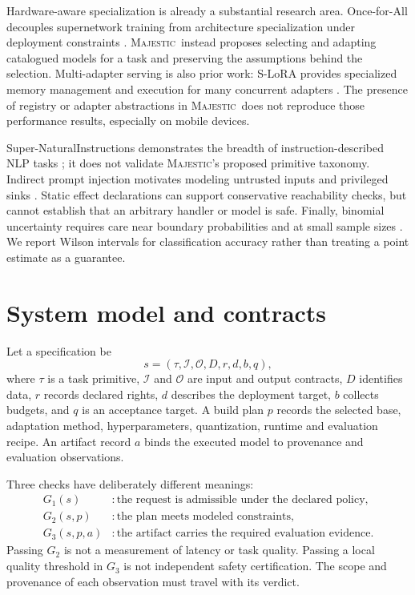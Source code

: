\documentclass[11pt,a4paper]{article}
\newcommand{\sys}{\textsc{Majestic}}
\begin{document}
Hardware-aware specialization is already a substantial research area.
Once-for-All decouples supernetwork training from architecture specialization
under deployment constraints \cite{ofa}. \sys\ instead proposes selecting and
adapting catalogued models for a task and preserving the assumptions behind the
selection. Multi-adapter serving is also prior work: S-LoRA provides specialized
memory management and execution for many concurrent adapters \cite{slora}.
The presence of registry or adapter abstractions in \sys\ does not reproduce
those performance results, especially on mobile devices.

Super-NaturalInstructions demonstrates the breadth of instruction-described NLP
tasks \cite{sni}; it does not validate \sys's proposed primitive taxonomy.
Indirect prompt injection motivates modeling untrusted inputs and privileged
sinks \cite{injection}. Static effect declarations can support conservative
reachability checks, but cannot establish that an arbitrary handler or model is
safe. Finally, binomial uncertainty requires care near boundary probabilities
and at small sample sizes \cite{binomial}. We report Wilson intervals for
classification accuracy rather than treating a point estimate as a guarantee.

\section{System model and contracts}
Let a specification be
\begin{equation}
s=(\tau,\mathcal{I},\mathcal{O},D,r,d,b,q),
\end{equation}
where $\tau$ is a task primitive, $\mathcal{I}$ and $\mathcal{O}$ are input and
output contracts, $D$ identifies data, $r$ records declared rights, $d$ describes
the deployment target, $b$ collects budgets, and $q$ is an acceptance target.
A build plan $p$ records the selected base, adaptation method, hyperparameters,
quantization, runtime and evaluation recipe. An artifact record $a$ binds the
executed model to provenance and evaluation observations.

Three checks have deliberately different meanings:
\begin{align}
G_1(s)&:\text{the request is admissible under the declared policy},\\
G_2(s,p)&:\text{the plan meets modeled constraints},\\
G_3(s,p,a)&:\text{the artifact carries the required evaluation evidence}.
\end{align}
Passing $G_2$ is not a measurement of latency or task quality. Passing a local
quality threshold in $G_3$ is not independent safety certification. The scope
and provenance of each observation must travel with its verdict.
\end{document}
